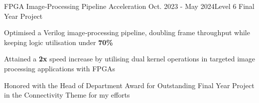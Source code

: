 \begin{rSubsection}{FPGA Image‑Processing Pipeline Acceleration} {Oct. 2023 - May 2024}{Level 6 Final Year Project}{}
\item Optimised a Verilog image‑processing pipeline, doubling frame throughput while keeping logic utilisation under \textbf{70\%}
\item Attained a  \textbf{2x} speed increase by utilising dual kernel operations in targeted image processing applications with FPGAs
\item Honored with the Head of Department Award for Outstanding Final Year Project in the Connectivity Theme for my efforts
\end{rSubsection}